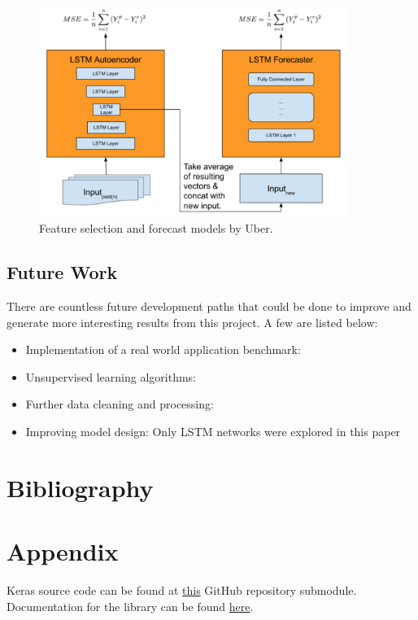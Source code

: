 \documentclass[10pt,onecolumn,letterpaper]{article}
\begin{document}
\begin{figure}[!hbt!]
\centering
\includegraphics[width=10cm]{uber_architecture}
\caption{Feature selection and forecast models by Uber.}
\end{figure}

\subsection{Future Work} 

There are countless future development paths that could be done to improve and generate more interesting results from this project. A few are listed below:  

\begin{itemize}
	\item Implementation of a real world application benchmark: 
	\item Unsupervised learning algorithms:
	\item Further data cleaning and processing:
	\item Improving model design: Only LSTM networks were explored in this paper
\end{itemize}

\newpage

\section{Bibliography}

{
\small


}

\newpage
 
\section{Appendix}

Keras source code can be found at \href{https://github.com/keras-team/keras/tree/master/keras}{this} GitHub repository submodule. Documentation for the library can be found \href{https://keras.io/}{here}.
\end{document}
